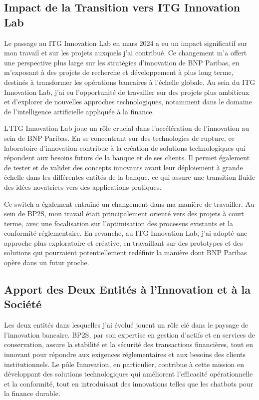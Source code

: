\documentclass[13pt,a4paper]{article}
\begin{document}
\subsection{Impact de la Transition vers ITG Innovation Lab} 
Le passage au ITG Innovation Lab en mars 2024 a eu un impact significatif sur mon travail et sur les projets auxquels j'ai contribué. Ce changement m'a offert une perspective plus large sur les stratégies d'innovation de BNP Paribas, en m'exposant à des projets de recherche et développement à plus long terme, destinés à transformer les opérations bancaires à l'échelle globale. Au sein du ITG Innovation Lab, j'ai eu l'opportunité de travailler sur des projets plus ambitieux et d'explorer de nouvelles approches technologiques, notamment dans le domaine de l'intelligence artificielle appliquée à la finance.

L'ITG Innovation Lab joue un rôle crucial dans l'accélération de l'innovation au sein de BNP Paribas. En se concentrant sur des technologies de rupture, ce laboratoire d'innovation contribue à la création de solutions technologiques qui répondent aux besoins futurs de la banque et de ses clients. Il permet également de tester et de valider des concepts innovants avant leur déploiement à grande échelle dans les différentes entités de la banque, ce qui assure une transition fluide des idées novatrices vers des applications pratiques.

Ce switch a également entraîné un changement dans ma manière de travailler. Au sein de BP2S, mon travail était principalement orienté vers des projets à court terme, avec une focalisation sur l'optimisation des processus existants et la conformité réglementaire. En revanche, au ITG Innovation Lab, j'ai adopté une approche plus exploratoire et créative, en travaillant sur des prototypes et des solutions qui pourraient potentiellement redéfinir la manière dont BNP Paribas opère dans un futur proche.

\subsection{Apport des Deux Entités à l'Innovation et à la Société} 
Les deux entités dans lesquelles j'ai évolué jouent un rôle clé dans le paysage de l'innovation bancaire. BP2S, par son expertise en gestion d'actifs et en services de conservation, assure la stabilité et la sécurité des transactions financières, tout en innovant pour répondre aux exigences réglementaires et aux besoins des clients institutionnels. Le pôle Innovation, en particulier, contribue à cette mission en développant des solutions technologiques qui améliorent l'efficacité opérationnelle et la conformité, tout en introduisant des innovations telles que les chatbots pour la finance durable.
\end{document}
